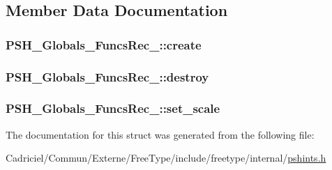 \subsection{Member Data Documentation}
\hypertarget{struct_p_s_h___globals___funcs_rec___ac136cec55ea33a2e3b60ffdad20f5420}{
\subsubsection[{create}]{ P\-S\-H\-\_\-\-Globals\-\_\-\-Funcs\-Rec\-\_\-\-::create}}\label{struct_p_s_h___globals___funcs_rec___ac136cec55ea33a2e3b60ffdad20f5420}
\hypertarget{struct_p_s_h___globals___funcs_rec___aebb5534f8305a189b09adfebff4f57ba}{
\subsubsection[{destroy}]{ P\-S\-H\-\_\-\-Globals\-\_\-\-Funcs\-Rec\-\_\-\-::destroy}}\label{struct_p_s_h___globals___funcs_rec___aebb5534f8305a189b09adfebff4f57ba}
\hypertarget{struct_p_s_h___globals___funcs_rec___a9c97456d3f521cb1091f08c2bda27332}{
\subsubsection[{set\-\_\-scale}]{ P\-S\-H\-\_\-\-Globals\-\_\-\-Funcs\-Rec\-\_\-\-::set\-\_\-scale}}\label{struct_p_s_h___globals___funcs_rec___a9c97456d3f521cb1091f08c2bda27332}


The documentation for this struct was generated from the following file\-:\begin{DoxyCompactItemize}
\item 
Cadriciel/\-Commun/\-Externe/\-Free\-Type/include/freetype/internal/\hyperlink{pshints_8h}{pshints.\-h}\end{DoxyCompactItemize}
